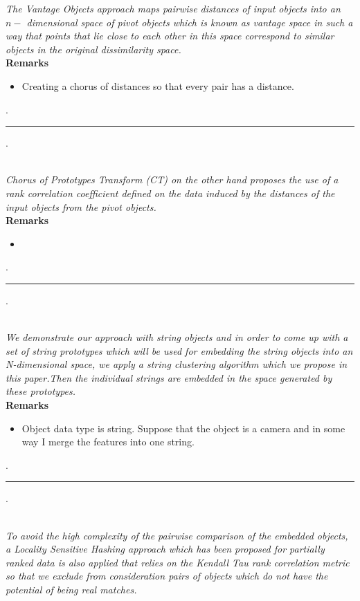 \documentclass[
	12pt, %
]{fphw}
\begin{document}
\textit{The Vantage Objects approach maps
pairwise distances of input objects into an $ n -$ dimensional space
of pivot objects which is known as vantage space in such a way
that points that lie close to each other in this space correspond to
similar objects in the original dissimilarity space.}
\\
\textbf{Remarks}\
\begin{itemize}
    \item Creating a chorus of distances so that every pair has a distance.
\end{itemize}
\begin{center}
    . \noindent\rule{5cm}{0.5pt} .
\end{center}
\\
\textit{Chorus of
Prototypes Transform (CT) on the other hand proposes the use of
a rank correlation coefficient defined on the data induced by the
distances of the input objects from the pivot objects.}
\\
\textbf{Remarks}\
\begin{itemize}
    \item 
\end{itemize}
\begin{center}
    . \noindent\rule{5cm}{0.5pt} .
\end{center}
\\
\textit{We demonstrate our approach with string objects and in order
to come up with a set of string prototypes which will be used for
embedding the string objects into an N-dimensional space, we apply a string clustering algorithm which we propose in this paper.Then the individual strings are embedded in the space generated
by these prototypes.}
\\
\textbf{Remarks}\
\begin{itemize}
    \item Object data type is string. Suppose that the object is a camera and in some way I merge the features into one string. 
\end{itemize}
\begin{center}
    . \noindent\rule{5cm}{0.5pt} .
\end{center}
\\
\textit{To avoid the high complexity of the pairwise comparison of the
embedded objects, a Locality Sensitive Hashing approach which
has been proposed for partially ranked data is also applied that
relies on the Kendall Tau rank correlation metric so that we exclude
from consideration pairs of objects which do not have the potential
of being real matches.}
\end{document}
